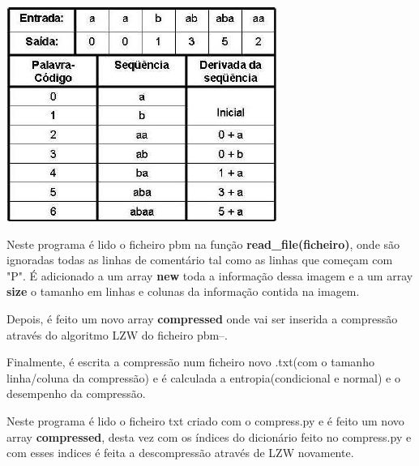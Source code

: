 \documentclass[12pt, a4paper]{article}
\begin{document}
\vspace{50px}
\includegraphics[scale=1]{lzw.png}

\newpage

\bigskip
{}
\vspace{40px}

\begin{justify} \begin{large}
Neste programa é lido o ficheiro pbm na função \textbf{read\_file(ficheiro)}, onde são ignoradas todas as linhas de comentário tal como as linhas que começam com "P". É adicionado a um array \textbf{new} toda a informação dessa imagem e a um array \textbf{size} o tamanho em linhas e colunas da informação contida na imagem.\vspace{7px}

Depois, é feito um novo array \textbf{compressed} onde vai ser inserida a compressão através do algoritmo LZW do ficheiro pbm--.\vspace{7px}

Finalmente, é escrita a compressão num ficheiro novo .txt(com o tamanho linha/coluna da compressão) e é calculada a entropia(condicional e normal) e o desempenho da compressão.
\end{large} \end{justify}

\vspace{10px}
\vspace{40px}

\begin{justify} 
\begin{large}
Neste programa é lido o ficheiro txt criado com o compress.py e é feito um novo array \textbf{compressed}, desta vez com os índices do dicionário feito no compress.py e com esses indices é feita a descompressão através de LZW novamente.
\end{large}
\end{justify}
\end{document}
